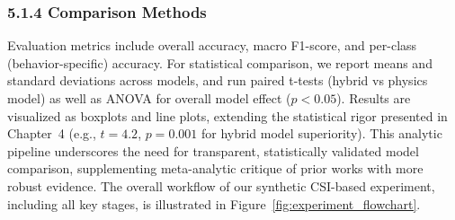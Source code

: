 \documentclass[Afour,sageh,times]{sagej}
\begin{document}
\subsubsection{5.1.4 Comparison Methods}

Evaluation metrics include overall accuracy, macro F1-score, and per-class (behavior-specific) accuracy. For statistical comparison, we report means and standard deviations across models, and run paired t-tests (hybrid vs physics model) as well as ANOVA for overall model effect ($p < 0.05$). Results are visualized as boxplots and line plots, extending the statistical rigor presented in Chapter~4 (e.g., $t=4.2$, $p=0.001$ for hybrid model superiority). This analytic pipeline underscores the need for transparent, statistically validated model comparison, supplementing meta-analytic critique of prior works with more robust evidence. The overall workflow of our synthetic CSI-based experiment, including all key stages, is illustrated in Figure~\ref{fig:experiment_flowchart}.
\end{document}
